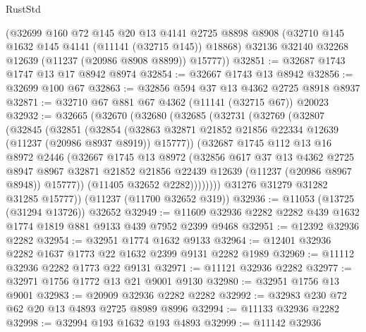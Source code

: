 \begin{lexlean}{RustStd}
\begin{coremodule}
      (@32699
        @160
        @72
        @145
        @20
        @13
        @4141
        @2725
        @8898
        @8908
        (@32710 @145 @1632 @145 @4141 (@11141 (@32715 @145)) @18868)
        @32136
        @32140
        @32268
        @12639
        (@11237 (@20986 @8908 @8899))
        @15777))
@32851 := @32687 @1743 @1747 @13 @17 @8942 @8974
@32854 := @32667 @1743 @13 @8942
@32856 := @32699 @100 @67
@32863 := @32856 @594 @37 @13 @4362 @2725 @8918 @8937
@32871 := @32710 @67 @881 @67 @4362 (@11141 (@32715 @67)) @20023
@32932 := @32665
    (@32670
      (@32680
        (@32685
          (@32731
            (@32769
              (@32807
                (@32845
                  (@32851
                    (@32854
                      (@32863
                        @32871
                        @21852
                        @21856
                        @22334
                        @12639
                        (@11237 (@20986 @8937 @8919))
                        @15777))
                    (@32687
                      @1745
                      @112
                      @13
                      @16
                      @8972
                      @2446
                      (@32667
                        @1745
                        @13
                        @8972
                        (@32856
                          @617
                          @37
                          @13
                          @4362
                          @2725
                          @8947
                          @8967
                          @32871
                          @21852
                          @21856
                          @22439
                          @12639
                          (@11237 (@20986 @8967 @8948))
                          @15777))
                      (@11405 @32652 @2282))))))))
        @31276
        @31279
        @31282
        @31285
        @15777))
    (@11237 (@11700 @32652 @319))
@32936 := @11053 (@13725 (@31294 @13726)) @32652
@32949 := @11609 @32936 @2282 @2282 @439 @1632 @1774 @1819 @881 @9133 @439 @7952 @2399 @9468
@32951 := @12392 @32936 @2282
@32954 := @32951 @1774 @1632 @9133
@32964 := @12401 @32936 @2282 @1637 @1773 @22 @1632 @2399 @9131 @2282 @1989
@32969 := @11112 @32936 @2282 @1773 @22 @9131
@32971 := @11121 @32936 @2282
@32977 := @32971 @1756 @1772 @13 @21 @9001 @9130
@32980 := @32951 @1756 @13 @9001
@32983 := @20909 @32936 @2282 @2282
@32992 := @32983 @230 @72 @62 @20 @13 @4893 @2725 @8989 @8996
@32994 := @11133 @32936 @2282
@32998 := @32994 @193 @1632 @193 @4893
@32999 := @11142 @32936

\end{coremodule}
\end{lexlean}

